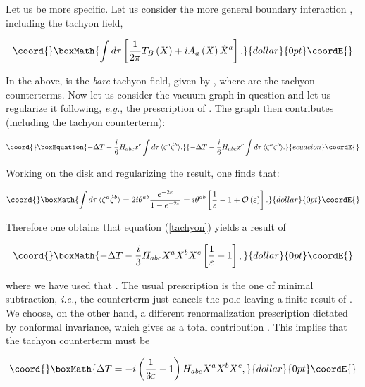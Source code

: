 \documentclass[a4paper,11pt]{article}
\begin{document}
Let us be more specific. Let us consider the more general boundary 
interaction \coordHE{}, including the tachyon field,

$$\coord{}\boxMath{
\int d\tau \left[ \frac{1}{2\pi }T_B\left( X\right) +iA_{a}\left( 
X\right) \dot{X}^{a}\right] .
}{dollar}{0pt}\coordE{}$$

\noindent
In the above, \coordHE{} is the {\it bare} tachyon field, given by
\coordHE{}, where \coordHE{} are the tachyon counterterms.
Now let us consider the vacuum graph in question and let us
regularize it following, \textit{e.g.}, the prescription of 
\cite{Tseytlin-BSFT}. The graph then contributes (including the tachyon 
counterterm):

\begin{equation}\coord{}\boxEquation{ \label{tachyon}
- \Delta T -\frac{i}{6}H_{abc}x^{c}\int d\tau \, \langle \zeta 
^{a}\dot{\zeta}^{b} \rangle .
}{ - \Delta T -\frac{i}{6}H_{abc}x^{c}\int d\tau \, \langle \zeta 
^{a}\dot{\zeta}^{b} \rangle .
}{ecuacion}\coordE{}\end{equation}

\noindent
Working on the disk and regularizing \cite{Tseytlin-BSFT} the result, one finds 
that:

$$\coord{}\boxMath{
\int d\tau \, \langle \zeta ^{a}\dot{\zeta}^{b} \rangle =
2i\theta ^{ab}\frac{e^{-2\varepsilon }}{1-e^{-2\varepsilon }} 
= i\theta ^{ab}\left[ \frac{1}{\varepsilon } - 1 + {\cal O}\left( \varepsilon 
\right) \right] .
}{dollar}{0pt}\coordE{}$$

\noindent
Therefore one obtains that equation (\ref{tachyon}) yields a result of

$$\coord{}\boxMath{
-\Delta T - \frac{i}{3}H_{abc}X^a X^b X^c \left[ \frac{1}
{\varepsilon }-1\right] ,
}{dollar}{0pt}\coordE{}$$

\noindent
where we have used that \coordHE{}. The usual 
prescription is the one of minimal subtraction, {\it i.e.}, the counterterm 
just cancels the pole leaving a finite result of \coordHE{}. We choose, on the other hand, a different renormalization prescription 
dictated by conformal invariance, which gives as a total contribution 
\coordHE{}. This implies that the tachyon counterterm 
must be

$$\coord{}\boxMath{
\Delta T= -i\left( \frac{1}{3\varepsilon }-1\right)
H_{abc} X^a X^b X^c  ,
}{dollar}{0pt}\coordE{}$$
\end{document}
